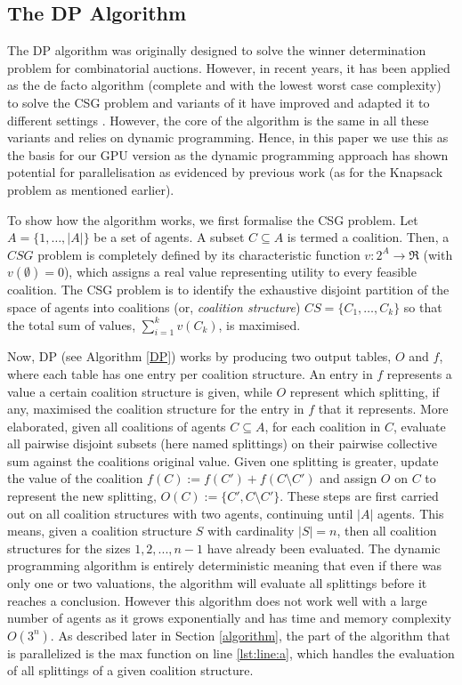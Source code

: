 \documentclass{llncs}
\begin{document}
\subsection{The {DP} Algorithm} 
The DP algorithm \cite{DPalgorithm} was originally designed to solve the winner determination problem for combinatorial auctions. However, in recent years, it has been applied as the de facto  algorithm (complete and with the lowest worst case complexity) to solve the CSG problem and variants of it have improved and adapted it to different settings \cite{DBLP:conf/atal/RahwanJ08,DBLP:conf/aamas/VoiceRJ12}. However, the core of the algorithm is the same in all these variants and relies on dynamic programming. Hence, in this paper we use this as the basis for our GPU version as the dynamic programming approach has shown potential for parallelisation as evidenced by previous work (as for the Knapsack problem as mentioned earlier). 

To show how the algorithm works, we first formalise the CSG problem.  Let $A=\{1,\ldots,\vert A \vert \}$ be a set of agents. A subset $C \subseteq A$ is termed a coalition.  Then, a $CSG$ problem is completely defined by its characteristic function $v: 2^{A} \rightarrow \Re$ (with $v(\emptyset)=0$), which assigns a real value representing utility to every feasible coalition.  The CSG problem is to identify the exhaustive disjoint partition of the space of agents into coalitions (or, \emph{coalition structure})  $CS=\{C_1,\ldots,C_k\}$ so that the total sum of values, $\sum^k_{i=1} v(C_k)$,
is maximised.

Now, DP (see Algorithm  \ref{DP}) works by producing two output tables, $O$ and $f$, 
where each table has one entry per coalition structure. 
An entry in $f$ represents a value a certain coalition structure is given, 
while $O$ represent which splitting, if any, maximised the coalition structure for the entry in $f$ that it represents.
More elaborated, given all coalitions of agents $C\subseteq A$, for each coalition in $C$, evaluate all
pairwise disjoint subsets (here named splittings) on their pairwise collective sum against the coalitions
original value. Given one splitting is greater, update the value of the coalition $f(C) := f(C') + f(C\setminus C')$
and assign $O$ on $C$ to represent the new splitting, $O(C) := \{C',C\setminus C'\}$. These steps are first carried out on all coalition structures with two agents, continuing until $|A|$ agents.  This means, given a coalition structure $S$ with cardinality $|S| = n$, then all coalition structures
for the sizes $1,2,...,n-1$ have already been evaluated. The dynamic programming algorithm is entirely deterministic meaning that even if there was only one or two valuations, the algorithm will evaluate all splittings before it reaches a conclusion. However this algorithm does not work well with a large number of agents as it grows exponentially and has time and memory complexity $O(3^n)$. As described later in Section \ref{algorithm}, the part of the algorithm that is parallelized is the max function on line \ref{lst:line:a}, which handles the evaluation of all splittings of a given coalition structure.
\end{document}

